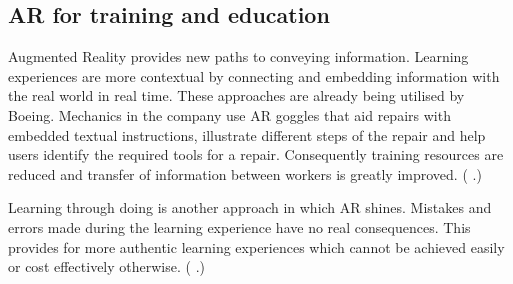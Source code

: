 \documentclass[12pt, a4paper,oneside, nocenter]{thesis}
\renewcommand{\citep}[1]{(\citeauthor{#1} \citeyear{#1}.)}
\begin{document}
\subsection{AR for training and education}%
Augmented Reality provides new paths to conveying information. Learning experiences are more contextual by connecting and embedding information with the real world in real time. These approaches are already being utilised by Boeing. 
Mechanics in the company use AR goggles that aid repairs with embedded textual instructions, 
illustrate different steps of the repair and help users identify the required tools for a repair. 
Consequently training resources are reduced and transfer of information between workers is greatly 
improved. \citep{horizon-report}
\par
Learning through doing is another approach in which AR shines. Mistakes and errors made during the learning
experience have no real consequences. This provides for more authentic learning experiences which cannot be
achieved easily or cost effectively otherwise. \citep{augmented-reality}
\end{document}
